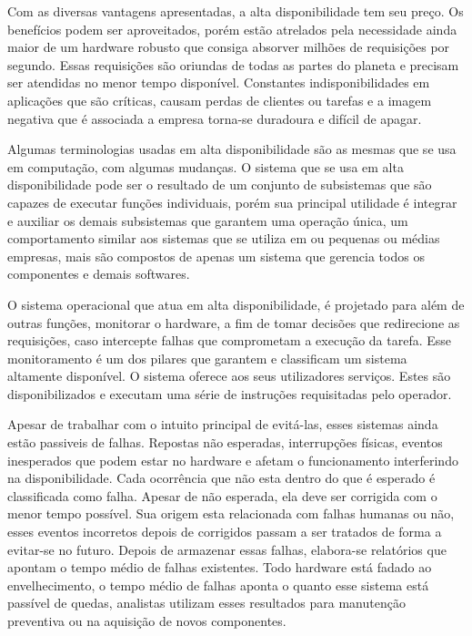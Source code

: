 Com as diversas vantagens apresentadas, a alta disponibilidade tem seu preço. Os benefícios podem ser aproveitados, porém estão atrelados pela necessidade ainda maior de um hardware robusto que consiga absorver milhões de requisições por segundo. Essas requisições são oriundas de todas as partes do planeta e precisam ser atendidas no menor tempo disponível. Constantes indisponibilidades em aplicações que são críticas, causam perdas de clientes ou tarefas e a imagem negativa que é associada a empresa torna-se duradoura e difícil de apagar.


Algumas terminologias usadas em alta disponibilidade são as mesmas que se usa em computação, com algumas mudanças. O sistema que se usa em alta disponibilidade pode ser o resultado de um conjunto de subsistemas que são capazes de executar funções individuais, porém sua principal utilidade é integrar e auxiliar os demais subsistemas que garantem uma operação única, um comportamento similar aos sistemas que se utiliza em ou pequenas ou médias empresas, mais são compostos de apenas um sistema que gerencia todos os componentes e demais softwares.


O sistema operacional que atua em alta disponibilidade, é projetado para além de outras funções, monitorar o hardware, a fim de tomar decisões que redirecione as requisições, caso intercepte falhas que comprometam a execução da tarefa. Esse monitoramento é um dos pilares que garantem e classificam um sistema altamente disponível.
O sistema oferece aos seus utilizadores serviços. Estes são disponibilizados e executam uma série de instruções requisitadas pelo operador.


Apesar de trabalhar com o intuito principal de evitá-las, esses sistemas ainda estão passiveis de falhas. Repostas não esperadas, interrupções físicas, eventos inesperados que podem estar no hardware e afetam o funcionamento interferindo na disponibilidade. Cada ocorrência que não esta dentro do que é esperado é classificada como falha. Apesar de não esperada, ela deve ser corrigida com o menor tempo possível. Sua origem esta relacionada com falhas humanas ou não, esses eventos incorretos depois de corrigidos passam a ser tratados de forma a evitar-se no futuro. Depois de armazenar essas falhas, elabora-se relatórios que apontam o tempo médio de falhas existentes. Todo hardware está fadado ao envelhecimento, o tempo médio de falhas aponta o quanto esse sistema está passível de quedas, analistas utilizam esses resultados para manutenção preventiva ou na aquisição de novos componentes.


